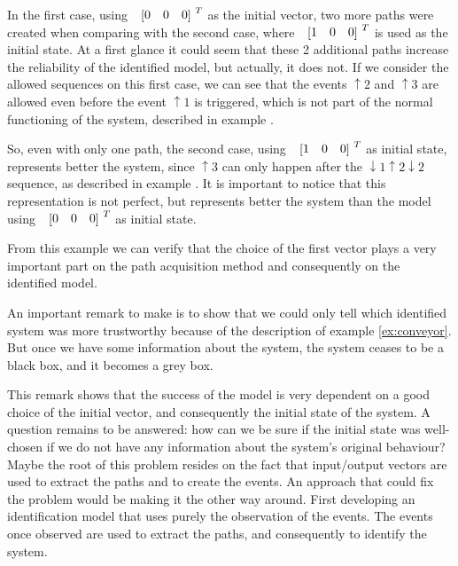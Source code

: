   In the first case, using $\colvec{0&0&0}^T$ as the initial vector, two more
  paths were created when comparing with the second case, where
  $\colvec{1&0&0}^T$ is used as the initial state. At a first glance it could
  seem that these 2 additional paths increase the reliability of the identified model,
  but actually, it does not. If we consider the allowed
  sequences on this first case, we can see that the events $\uparrow 2$ and
  $\uparrow 3$ are allowed even before the event $\uparrow 1$ is triggered,
  which is not part of the normal functioning of the system, described in
  example .

  So, even with only one path, the second case, using $\colvec{1&0&0}^T$ as
  initial state, represents better the system, since $\uparrow 3$ can only happen
  after the $\downarrow 1\uparrow 2\downarrow 2$ sequence, as described in
  example . It is important to notice that this
  representation is not perfect, but represents better the system than the model
  using $\colvec{0&0&0}^T$ as initial state.

  From this example we can verify that the choice of the first vector plays a very important part on
  the
  path acquisition method and consequently on the identified
  model.
  \begin{observation}
  An important remark to make is to show that we could only tell
  which identified system was more trustworthy because of the description of
  example \ref{ex:conveyor}. But once we have some information about the system,
  the system ceases to be a black box, and it becomes a grey box. 
\end{observation}

This remark shows that the success of the \DAOCT{} model is very dependent on a good
choice of the initial vector, and consequently the initial state of the
system. A question remains to be answered: how can we be sure if the
initial state was well-chosen if we do not have any information about the system's original behaviour?
Maybe the root of this problem resides on the fact that input\slash output vectors
are used to extract the paths and to create the events. An approach that could
fix the problem would be
making it the other way around. First developing an identification model that uses purely
the observation of the events. The events once observed are used to
extract the paths, and consequently to identify the system.
